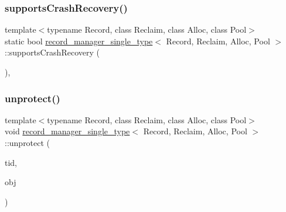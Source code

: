 \mbox{\label{classrecord__manager__single__type_a58d8ea1365033ef1f74b9b6956f534b3}} 
\subsubsection{\texorpdfstring{supports\+Crash\+Recovery()}{supportsCrashRecovery()}}
{\footnotesize\ttfamily template$<$typename Record, class Reclaim, class Alloc, class Pool$>$ \\
static bool \hyperlink{classrecord__manager__single__type}{record\+\_\+manager\+\_\+single\+\_\+type}$<$ Record, Reclaim, Alloc, Pool $>$\+::supports\+Crash\+Recovery (\begin{DoxyParamCaption}{ }\end{DoxyParamCaption})\hspace{0.3cm}{\ttfamily [inline]}, {\ttfamily [static]}}

\mbox{\label{classrecord__manager__single__type_ae21f5c6f516be7b94c37eb81879b5099}} 
\subsubsection{\texorpdfstring{unprotect()}{unprotect()}}
{\footnotesize\ttfamily template$<$typename Record, class Reclaim, class Alloc, class Pool$>$ \\
void \hyperlink{classrecord__manager__single__type}{record\+\_\+manager\+\_\+single\+\_\+type}$<$ Record, Reclaim, Alloc, Pool $>$\+::unprotect (\begin{DoxyParamCaption}\item[{const int}]{tid,  }\item[{\hyperlink{classrecord__manager__single__type_a065f05d1a84e619758122b3da04b1327}{record\+\_\+pointer}}]{obj }\end{DoxyParamCaption})\hspace{0.3cm}{\ttfamily [inline]}}



